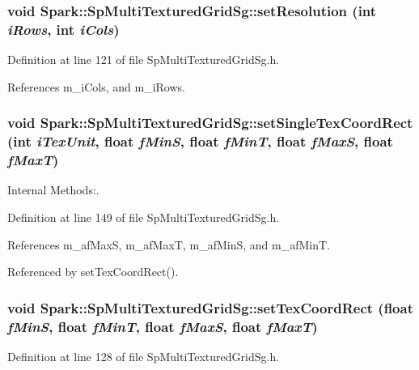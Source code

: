 \subsubsection{\setlength{\rightskip}{0pt plus 5cm}void Spark::Sp\-Multi\-Textured\-Grid\-Sg::set\-Resolution (int {\em i\-Rows}, int {\em i\-Cols})\hspace{0.3cm}{\tt  [inline]}}\label{classSpark_1_1SpMultiTexturedGridSg_a3}


Definition at line 121 of file Sp\-Multi\-Textured\-Grid\-Sg.h.

References m\_\-i\-Cols, and m\_\-i\-Rows.
\subsubsection{\setlength{\rightskip}{0pt plus 5cm}void Spark::Sp\-Multi\-Textured\-Grid\-Sg::set\-Single\-Tex\-Coord\-Rect (int {\em i\-Tex\-Unit}, float {\em f\-Min\-S}, float {\em f\-Min\-T}, float {\em f\-Max\-S}, float {\em f\-Max\-T})\hspace{0.3cm}{\tt  [inline, protected]}}\label{classSpark_1_1SpMultiTexturedGridSg_b0}


Internal Methods:. 

Definition at line 149 of file Sp\-Multi\-Textured\-Grid\-Sg.h.

References m\_\-af\-Max\-S, m\_\-af\-Max\-T, m\_\-af\-Min\-S, and m\_\-af\-Min\-T.

Referenced by set\-Tex\-Coord\-Rect().
\subsubsection{\setlength{\rightskip}{0pt plus 5cm}void Spark::Sp\-Multi\-Textured\-Grid\-Sg::set\-Tex\-Coord\-Rect (float {\em f\-Min\-S}, float {\em f\-Min\-T}, float {\em f\-Max\-S}, float {\em f\-Max\-T})\hspace{0.3cm}{\tt  [inline]}}\label{classSpark_1_1SpMultiTexturedGridSg_a4}


Definition at line 128 of file Sp\-Multi\-Textured\-Grid\-Sg.h.

